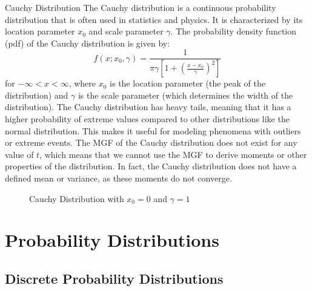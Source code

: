 \documentclass[openany]{book}
\begin{document}
\begin{example}{Cauchy Distribution}
    The Cauchy distribution is a continuous probability distribution that is often used in statistics and physics. It is characterized by its location parameter $x_0$ and scale parameter $\gamma$. The probability density function (pdf) of the Cauchy distribution is given by:
    $$f(x; x_0, \gamma) = \frac{1}{\pi \gamma \left[1 + \left(\frac{x - x_0}{\gamma}\right)^2\right]}$$
    for $-\infty < x < \infty$, where $x_0$ is the location parameter (the peak of the distribution) and $\gamma$ is the scale parameter (which determines the width of the distribution). The Cauchy distribution has heavy tails, meaning that it has a higher probability of extreme values compared to other distributions like the normal distribution. This makes it useful for modeling phenomena with outliers or extreme events.
    The MGF of the Cauchy distribution does not exist for any value of $t$, which means that we cannot use the MGF to derive moments or other properties of the distribution. In fact, the Cauchy distribution does not have a defined mean or variance, as these moments do not converge.
    \begin{figure}[H]
    \centering
    \caption{Cauchy Distribution with $x_0 = 0$ and $\gamma = 1$}
    \end{figure}
\end{example}
\chapter{Probability Distributions}
\section{Discrete Probability Distributions}
\end{document}
